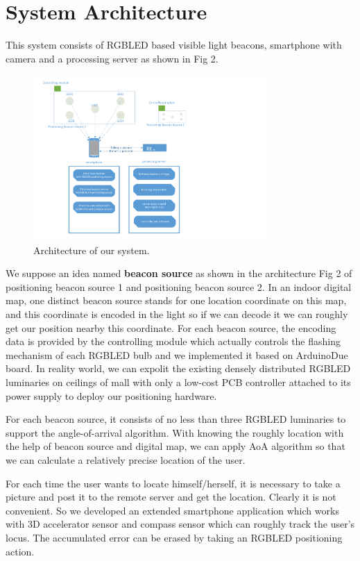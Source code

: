 \documentclass[conference]{IEEEtran}
\begin{document}
\section{System Architecture}
This system consists of RGBLED based visible light beacons, smartphone with camera and a processing server as shown in Fig 2.
	
	\begin{figure}
		\centering
		\includegraphics[width=3.5in]{../img.origin/fig2.pdf}
		\caption{Architecture of our system.}
		\label{fig_2}
	\end{figure}

We suppose an idea named \textbf{beacon source} as shown in the architecture Fig 2 of positioning beacon source 1 and positioning beacon source 2. In an indoor digital map, one distinct beacon source stands for one location coordinate on this map, and this coordinate is encoded in the light so if we can decode it we can roughly get our position nearby this coordinate. For each beacon source, the encoding data is provided by the controlling module which actually controls the flashing mechanism of each RGBLED bulb and we implemented it based on ArduinoDue board. In reality world, we can expolit the existing densely distributed RGBLED luminaries on ceilings of mall with only a low-cost PCB controller attached to its power supply to deploy our positioning hardware.

For each beacon source, it consists of no less than three RGBLED luminaries to support the angle-of-arrival algorithm. With knowing the roughly location with the help of beacon source and digital map, we can apply AoA algorithm so that we can calculate a relatively precise location of the user. 

For each time the user wants to locate himself/herself, it is necessary to take a picture and post it to the remote server and get the location. Clearly it is not convenient. So we developed an extended smartphone application which works with 3D accelerator sensor and compass sensor which can roughly track the user's locus. The accumulated error can be erased by taking an RGBLED positioning action.
	
\end{document}
